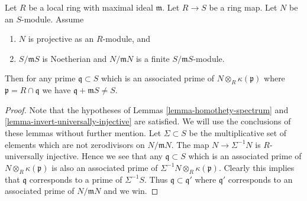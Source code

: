 \begin{lemma}
\label{lemma-explain-why-pure}
Let $R$ be a local ring with maximal ideal $\mathfrak m$.
Let $R \to S$ be a ring map. Let $N$ be an $S$-module.
Assume
\begin{enumerate}
\item $N$ is projective as an $R$-module, and
\item $S/\mathfrak mS$ is Noetherian and $N/\mathfrak mN$ is a finite
$S/\mathfrak mS$-module.
\end{enumerate}
Then for any prime $\mathfrak q \subset S$ which is an associated prime of
$N \otimes_R \kappa(\mathfrak p)$ where $\mathfrak p = R \cap \mathfrak q$
we have $\mathfrak q + \mathfrak m S \not = S$.
\end{lemma}

\begin{proof}
Note that the hypotheses of
Lemmas \ref{lemma-homothety-spectrum} and
\ref{lemma-invert-universally-injective}
are satisfied. We will use the conclusions of these lemmas without further
mention. Let $\Sigma \subset S$ be the multiplicative set of elements
which are not zerodivisors on $N/\mathfrak mN$. The map
$N \to \Sigma^{-1}N$ is $R$-universally injective. Hence we see that
any $\mathfrak q \subset S$ which is an associated prime of
$N \otimes_R \kappa(\mathfrak p)$ is also an associated prime of
$\Sigma^{-1}N \otimes_R \kappa(\mathfrak p)$. Clearly this implies that
$\mathfrak q$ corresponds to a prime of $\Sigma^{-1}S$.
Thus $\mathfrak q \subset \mathfrak q'$ where $\mathfrak q'$
corresponds to an associated prime of $N/\mathfrak mN$ and we win.
\end{proof}
